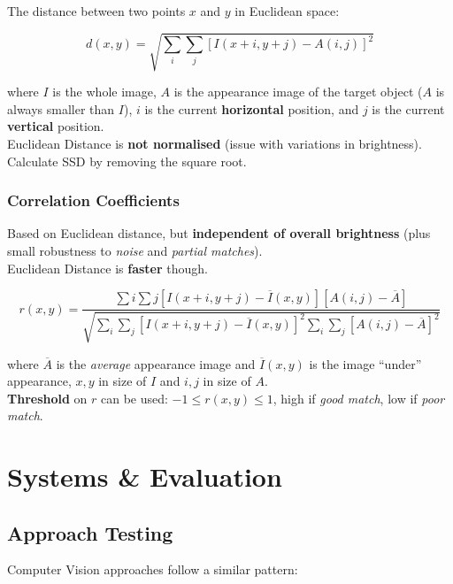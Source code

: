 \documentclass[english, 10pt]{article}
\begin{document}
The distance between two points $x$ and $y$ in Euclidean space:

$$ d(x, y) = \sqrt{\sum_{i}\sum_{j}[I(x + i, y + j) - A(i, j)]^2}$$

where $I$ is the whole image, $A$ is the appearance image of the target object ($A$ is always smaller than $I$), $i$ is the current \textbf{horizontal} position, and $j$ is the 
current \textbf{vertical} position. \\

Euclidean Distance is \textbf{not normalised} (issue with variations in brightness). \\

Calculate SSD by removing the square root.

\subsubsection{Correlation Coefficients}

Based on Euclidean distance, but \textbf{independent of overall brightness} (plus small robustness to \textit{noise} and \textit{partial matches}). \\

Euclidean Distance is \textbf{faster} though.

$$ r(x, y) = \frac{\sum{i}\sum{j}[I(x + i, y + j) - \overline{I}(x, y)][A(i, j) - \overline{A}]}{\sqrt{\sum_{i}\sum_{j}[I(x + i, y + j) - \overline{I}(x, y)]^2\sum_{i}\sum_{j}[A(i, j) - \overline{A}]^2}}$$

where $\overline{A}$ is the \textit{average} appearance image and $\overline{I}(x, y)$ is the image ``under'' appearance, $x, y$ in size of $I$ and $i, j$ in size of $A$. \\

\textbf{Threshold} on $r$ can be used: $-1 \leq r(x, y) \leq 1$, high if \textit{good match}, low if \textit{poor match}.

\section{Systems \& Evaluation}

\subsection{Approach Testing}

Computer Vision approaches follow a similar pattern:
\end{document}
